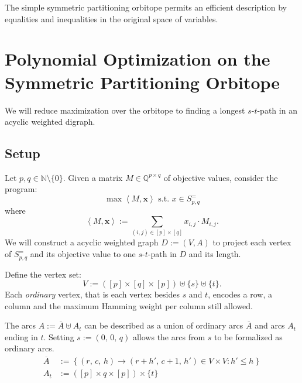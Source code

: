 \documentclass{amsart}
\theoremstyle{definition}
\begin{document}
The simple symmetric partitioning orbitope permits an efficient
description by equalities and inequalities in the original space of
variables.



\section{Polynomial Optimization on the  Symmetric Partitioning
  Orbitope}
\label{fluss}
We will reduce maximization over the orbitope to finding a longest
\(s\)-\(t\)-path in an acyclic weighted digraph.

\subsection{Setup}

Let \(p, q \in \mathbb{N} \setminus \{0\}\).  Given a matrix \(M \in
\mathbb{Q}^{p \times q}\) of objective values, consider the program:
\begin{equation}
\label{optS}
\max \left<M, \mathbf{x} \right>  \text{ s.t. } x \in S^=_{p,q}
\end{equation}
where \[\left<M, \mathbf{x} \right> := \sum_{(i,j)\in [p]\times [q]} x_{i,j}\cdot M_{i,j}\text{.}\]
We will construct a acyclic weighted graph \(D := (V, A)\) to project each vertex of
\(S^=_{p,q}\) and its objective value to one \(s\)-\(t\)-path in \(D\) and its length.

Define the vertex set:
\[V := \left( [p]\times [q] \times [p]\right) \uplus \{s\} \uplus \{t\}\text{.}\] 
Each \textit{ordinary} vertex, that is
each vertex besides \(s\) and \(t\), encodes a row, a column and the
maximum Hamming weight per column still allowed.

The arcs \(A := \overline{A} \uplus A_t\) can be described as a union
of ordinary arcs \(\overline{A}\) and arcs \(A_t\) ending in \(t\).  Setting
\(s:=(0,\, 0,\,q)\) allows the arcs from $s$ to be formalized as
ordinary arcs.
\begin{align}
  \overline{A} &:=
  \left\{ \left(r,\, c,\, h\right) \rightarrow \left(r+h',\, c+1,\, h'\right) \in V \times V \colon
  h' \leq h \right\} \\
  A_t &:= ([p] \times {q} \times [p]) \times \{t\}
\end{align}
\end{document}
